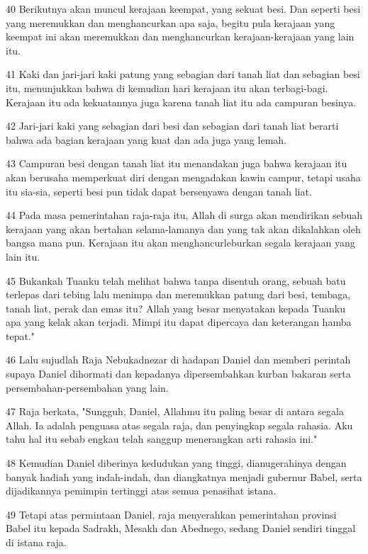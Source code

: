 \par 40 Berikutnya akan muncul kerajaan keempat, yang sekuat besi. Dan seperti besi yang meremukkan dan menghancurkan apa saja, begitu pula kerajaan yang keempat ini akan meremukkan dan menghancurkan kerajaan-kerajaan yang lain itu.
\par 41 Kaki dan jari-jari kaki patung yang sebagian dari tanah liat dan sebagian besi itu, menunjukkan bahwa di kemudian hari kerajaan itu akan terbagi-bagi. Kerajaan itu ada kekuatannya juga karena tanah liat itu ada campuran besinya.
\par 42 Jari-jari kaki yang sebagian dari besi dan sebagian dari tanah liat berarti bahwa ada bagian kerajaan yang kuat dan ada juga yang lemah.
\par 43 Campuran besi dengan tanah liat itu menandakan juga bahwa kerajaan itu akan berusaha memperkuat diri dengan mengadakan kawin campur, tetapi usaha itu sia-sia, seperti besi pun tidak dapat bersenyawa dengan tanah liat.
\par 44 Pada masa pemerintahan raja-raja itu, Allah di surga akan mendirikan sebuah kerajaan yang akan bertahan selama-lamanya dan yang tak akan dikalahkan oleh bangsa mana pun. Kerajaan itu akan menghancurleburkan segala kerajaan yang lain itu.
\par 45 Bukankah Tuanku telah melihat bahwa tanpa disentuh orang, sebuah batu terlepas dari tebing lalu menimpa dan meremukkan patung dari besi, tembaga, tanah liat, perak dan emas itu? Allah yang besar menyatakan kepada Tuanku apa yang kelak akan terjadi. Mimpi itu dapat dipercaya dan keterangan hamba tepat."
\par 46 Lalu sujudlah Raja Nebukadnezar di hadapan Daniel dan memberi perintah supaya Daniel dihormati dan kepadanya dipersembahkan kurban bakaran serta persembahan-persembahan yang lain.
\par 47 Raja berkata, "Sungguh, Daniel, Allahmu itu paling besar di antara segala Allah. Ia adalah penguasa atas segala raja, dan penyingkap segala rahasia. Aku tahu hal itu sebab engkau telah sanggup menerangkan arti rahasia ini."
\par 48 Kemudian Daniel diberinya kedudukan yang tinggi, dianugerahinya dengan banyak hadiah yang indah-indah, dan diangkatnya menjadi gubernur Babel, serta dijadikannya pemimpin tertinggi atas semua penasihat istana.
\par 49 Tetapi atas permintaan Daniel, raja menyerahkan pemerintahan provinsi Babel itu kepada Sadrakh, Mesakh dan Abednego, sedang Daniel sendiri tinggal di istana raja.

